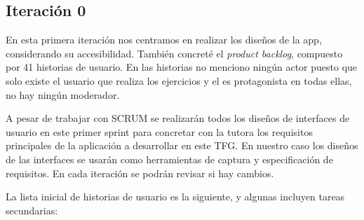 \subsection{Iteración 0}
En esta primera iteración nos centramos en realizar los diseños de la app, considerando su accesibilidad. También concreté el \textit{product backlog}, compuesto por 41 historias de usuario. En las historias no menciono ningún actor puesto que solo existe el usuario que realiza los ejercicios y el es protagonista en todas ellas, no hay ningún moderador.

A pesar de trabajar con SCRUM se realizarán todos los diseños de interfaces de usuario en este primer sprint para concretar con la tutora los requisitos principales de la aplicación a desarrollar en este TFG. En nuestro caso los diseños de las interfaces se usarán como herramientas de captura y especificación de requisitos. En cada iteración se podrán revisar si hay cambios. 

La lista inicial de historias de usuario es la siguiente, y algunas incluyen tareas secundarias:

